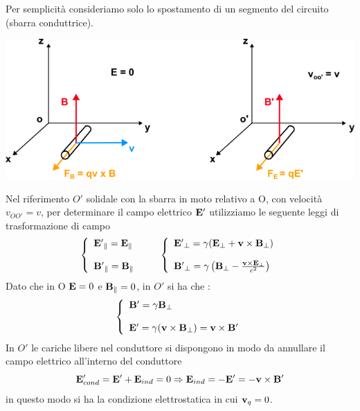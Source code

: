 Per semplicit\`a  consideriamo solo lo spostamento di un segmento del circuito (sbarra conduttrice).

\begin{center}
	\includegraphics[width = 15cm]{images/rel_bar.png}
\end{center}
Nel riferimento $O'$ solidale con la sbarra in moto relativo a O, con velocit\`a $v_{OO'} = v$, per determinare il campo elettrico $\bold{E'}$ utilizziamo le seguente leggi di trasformazione di campo
\begin{align}
\left \{ \begin{array}{l}
	\bold{E'}_{\parallel} = \bold{E}_{\parallel} \\ \rule{0pt}{20pt}
	\bold{B'}_{\parallel} = \bold{B}_{\parallel}
\end{array}	\right.
\quad \quad
\left \{ \begin{array}{l}
	\bold{E'}_{\perp} = \gamma (\bold{E}_{\perp} + \bold{v} \times \bold{B}_{\perp}) \\ \rule{0pt}{20pt}
	\bold{B'}_{\perp} = \gamma \left(\bold{B}_{\perp} - \frac{\bold{v} \times \bold{E}_{\perp}}{c^2} \right)
\end{array}	\right. 
\end{align}
Dato che in O $\bold{E} = 0$ e $\bold{B}_{\parallel} = 0$, in $O'$ si ha che :
\begin{align}
	\left \{ \begin{array}{l}
		\bold{B}' = \gamma \bold{B}_{\perp} \\ \rule {0pt}{20pt}
		\bold{E}' = \gamma (\bold{v} \times \bold{B}_{\perp}) = \bold{v} \times \bold{B}' 
	\end{array}\right.
\end{align}
In $O'$ le cariche libere nel conduttore si dispongono in modo da annullare il campo elettrico all'interno del conduttore 
\begin{equation*}
	\bold{E}'_{cond} = \bold{E}' + \bold{E}_{ind} = 0 \Rightarrow  \bold{E}_{ind} = -\bold{E}' =-\bold{v} \times \bold{B}'
\end{equation*}
in questo modo si ha la condizione elettrostatica in cui $\bold{v}_q = 0$.

